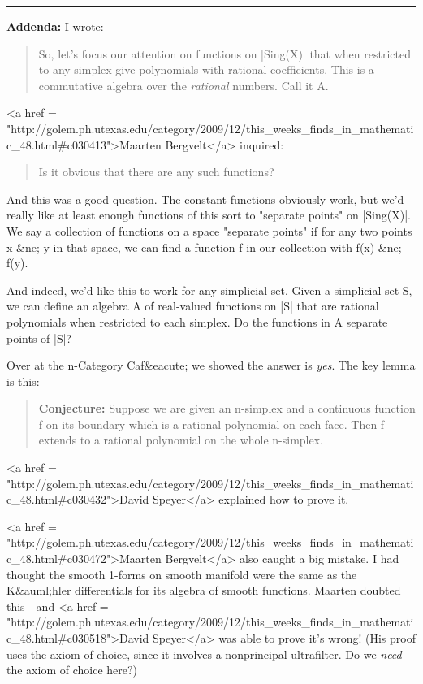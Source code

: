 \par\noindent\rule{\textwidth}{0.4pt}

\textbf{Addenda:}  I wrote:

\begin{quote}

So, let's focus our attention on functions on |Sing(X)| that when
restricted to any simplex give polynomials with rational coefficients.
This is a commutative algebra over the \emph{rational} numbers.  Call
it A.

\end{quote}

<a href = "http://golem.ph.utexas.edu/category/2009/12/this_weeks_finds_in_mathematic_48.html#c030413">Maarten Bergvelt</a> inquired:

\begin{quote}

Is it obvious that there are any such functions?

\end{quote}

And this was a good question.  The constant functions obviously work,
but we'd really like at least enough functions of this sort to
"separate points" on |Sing(X)|.  We say a collection of
functions on a space "separate points" if for any two points
x &ne; y in that space, we can find a function f in our collection
with f(x) &ne; f(y).

And indeed, we'd like this to work for any simplicial set.  Given a simplicial
set S, we can define an algebra A of real-valued functions on |S| that
are rational polynomials when restricted to each simplex.  Do the functions
in A separate points of |S|?

Over at the n-Category Caf&eacute; we showed the answer is \emph{yes}.
The key lemma is this:

\begin{quote}

   \textbf{Conjecture:} Suppose we are given an n-simplex and a continuous
   function f on its boundary which is a rational polynomial on each
   face.  Then f extends to a rational polynomial on the whole
   n-simplex.

\end{quote}

<a href = "http://golem.ph.utexas.edu/category/2009/12/this_weeks_finds_in_mathematic_48.html#c030432">David Speyer</a> explained how to prove it.

<a href =
"http://golem.ph.utexas.edu/category/2009/12/this_weeks_finds_in_mathematic_48.html#c030472">Maarten
Bergvelt</a> also caught a big mistake.  I had thought the smooth
1-forms on smooth manifold were the same as the K&auml;hler
differentials for its algebra of smooth functions.  Maarten doubted
this - and <a href =
"http://golem.ph.utexas.edu/category/2009/12/this_weeks_finds_in_mathematic_48.html#c030518">David
Speyer</a> was able to prove it's wrong!  (His proof uses the axiom of
choice, since it involves a nonprincipal ultrafilter.  Do we
\emph{need} the axiom of choice here?)

